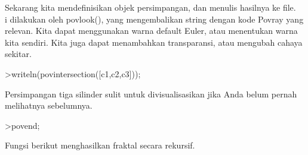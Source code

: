 \documentclass[12pt,arial,letterpaper]{book}
\begin{document}
\begin{eulercomment}
\begin{eulercomment}
\begin{eulercomment}
\begin{eulercomment}
\begin{eulercomment}
\begin{eulercomment}
\begin{eulercomment}
\begin{eulercomment}
\begin{eulercomment}
\begin{eulercomment}
\begin{eulercomment}
\begin{eulercomment}
\begin{eulercomment}
\begin{eulercomment}
\begin{eulercomment}
\begin{eulercomment}
\begin{eulercomment}
\begin{eulercomment}
\begin{euleroutput}
\end{euleroutput}
\begin{eulercomment}
Sekarang kita mendefinisikan objek persimpangan, dan menulis hasilnya
ke file.\\
i dilakukan oleh povlook(), yang mengembalikan string dengan kode
Povray yang relevan. Kita dapat menggunakan warna default Euler, atau
menentukan warna kita sendiri. Kita juga dapat menambahkan
transparansi, atau mengubah cahaya sekitar.
\end{eulercomment}
\begin{eulerprompt}
>writeln(povintersection([c1,c2,c3]));
\end{eulerprompt}
\begin{eulercomment}
Persimpangan tiga silinder sulit untuk divisualisasikan jika Anda
belum pernah melihatnya sebelumnya.
\end{eulercomment}
\begin{eulerprompt}
>povend;
\end{eulerprompt}
\begin{eulercomment}
Fungsi berikut menghasilkan fraktal secara rekursif.


\end{eulercomment}
\end{eulercomment}
\end{eulercomment}
\end{eulercomment}
\end{eulercomment}
\end{eulercomment}
\end{eulercomment}
\end{eulercomment}
\end{eulercomment}
\end{eulercomment}
\end{eulercomment}
\end{eulercomment}
\end{eulercomment}
\end{eulercomment}
\end{eulercomment}
\end{eulercomment}
\end{eulercomment}
\end{eulercomment}
\end{eulercomment}
\end{document}
